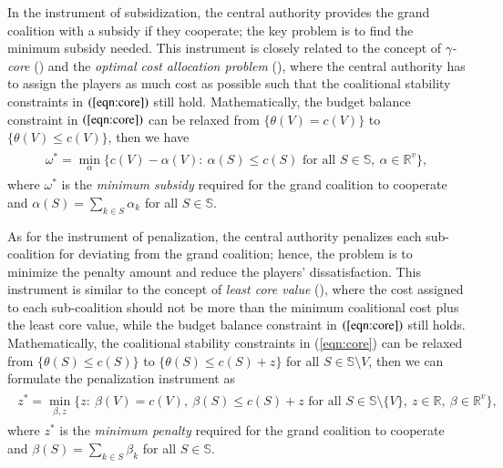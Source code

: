 \documentclass[authoryear,review,12pt]{elsarticle}
\newcommand{\R}{\mathbb{R}}
\begin{document}
In the instrument of subsidization, the central authority provides the grand coalition with a subsidy if they cooperate; the key problem is to find the minimum subsidy needed.
This instrument is closely related to the concept of \textit{$\gamma$-core} (\citealt{faigle1993some}) and the \textit{optimal cost allocation problem} (\citealt{Caprara2010LPB,LRCA2016}), where the central authority has to assign the players as much cost as possible such that the coalitional stability constraints in $(\ref{eqn:core})$ still hold.
Mathematically, the budget balance constraint in $(\ref{eqn:core})$ can be relaxed from $\big\{\theta(V) = c(V)\big\}$ to $\big\{\theta(V) \leq c(V)\big\}$, then we have
\begin{eqnarray*}\label{eqn:subsidy}
\begin{aligned}
\omega^* = \min_{\alpha} \bigg\{ c(V) - \alpha(V):~ \alpha(S) \leq c(S) \mbox{ for all } S \in \mathbb{S}, ~\alpha \in \R^v \bigg\},
\end{aligned}
\end{eqnarray*}
where $\omega^*$ is the \textit{minimum subsidy} required for the grand coalition to cooperate and $\alpha(S)=\sum_{k\in S}\alpha_k$ for all $S \in \mathbb{S}$.


As for the instrument of penalization, the central authority penalizes each sub-coalition for deviating from the grand coalition; hence, the problem is to minimize the penalty amount and reduce the players' dissatisfaction.
This instrument is similar to the concept of \textit{least core value} (\citealt{maschler1979geometric,schulz2010sharing}), where the cost assigned to each sub-coalition should not be more than the minimum coalitional cost plus the least core value, while the budget balance constraint in $(\ref{eqn:core})$ still holds.
Mathematically, the coalitional stability constraints in (\ref{eqn:core}) can be relaxed from $\big\{\theta(S) \leq c(S)\big\}$ to $\big\{\theta(S) \leq c(S)+z\big\}$ for all $S \in \mathbb{S} \setminus V$, then we can formulate the penalization instrument as
\begin{eqnarray*}\label{eqn:lc}
\begin{aligned}
z^* = \min_{\beta,z} \bigg\{ z: ~\beta(V)=c(V), ~\beta(S) \leq c(S)+z \mbox{ for all } S \in \mathbb{S} \setminus \{V\}, ~z \in \R, ~\beta \in \R^v \bigg\},
\end{aligned}
\end{eqnarray*}
where $z^*$ is the \textit{minimum penalty} required for the grand coalition to cooperate and $\beta(S)=\sum_{k\in S}\beta_k$ for all $S \in \mathbb{S}$.
\end{document}
